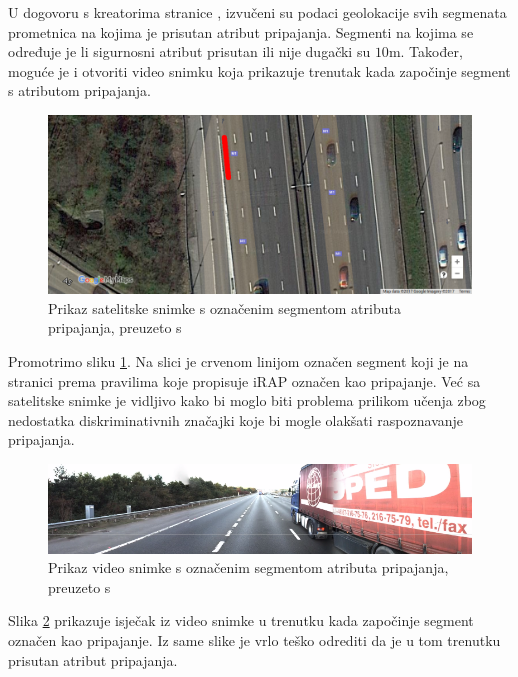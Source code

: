 \documentclass[times, utf8, diplomski, numeric]{fer}
\begin{document}
U dogovoru s kreatorima stranice \citep{url:ftts_irap}, izvučeni su podaci geolokacije svih segmenata prometnica na kojima je prisutan atribut pripajanja. 
Segmenti na kojima se određuje je li sigurnosni atribut prisutan ili nije dugački su $10$m.
Također, moguće je i otvoriti video snimku koja prikazuje trenutak kada započinje segment s atributom pripajanja.

\begin{figure}[H]
\centering
\includegraphics[scale=0.35]{images/sattelite_merge_lane_irap.png}
\caption{Prikaz satelitske snimke s označenim segmentom atributa pripajanja, preuzeto s \citep{url:google_maps}}
\label{img:sattelite_merge_lane_irap}
\end{figure}

Promotrimo sliku \ref{img:sattelite_merge_lane_irap}. Na slici je crvenom linijom označen segment koji je na stranici \citep{url:ftts_irap} prema pravilima koje propisuje iRAP označen kao pripajanje. 
Već sa satelitske snimke je vidljivo kako bi moglo biti problema prilikom učenja zbog nedostatka diskriminativnih značajki koje bi mogle olakšati raspoznavanje pripajanja.

\begin{figure}[H]
\centering
\includegraphics[scale=0.5]{images/video_merge_lane_irap.png}
\caption{Prikaz video snimke s označenim segmentom atributa pripajanja, preuzeto s \citep{url:ftts_irap}}
\label{img:video_merge_lane_irap}
\end{figure}

\noindent Slika \ref{img:video_merge_lane_irap} prikazuje isječak iz video snimke u trenutku kada započinje segment označen kao pripajanje. 
Iz same slike je vrlo teško odrediti da je u tom trenutku prisutan atribut pripajanja.
\end{document}
